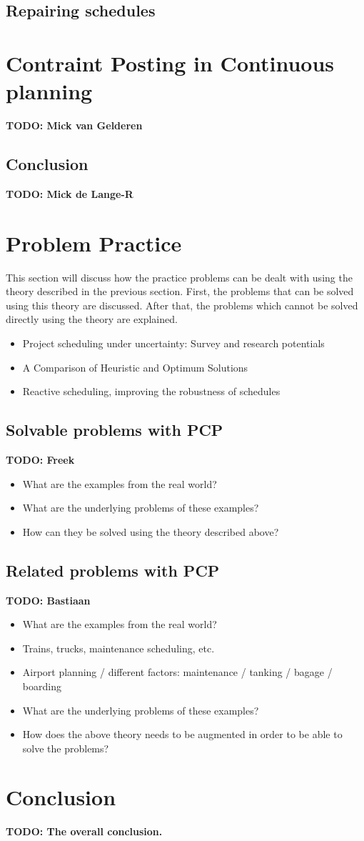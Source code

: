 \documentclass{article}
\newcommand{\TODO}[1]{{\color{red}\textbf{TODO: #1}}}
\begin{document}
\subsection{Repairing schedules}
\cite{chien00}

\section{Contraint Posting in Continuous planning}
\TODO{Mick van Gelderen}

\subsection{Conclusion}
\TODO{Mick de Lange-R}

\section{Problem Practice}
This section will discuss how the practice problems can be dealt with using the theory described in the previous section. First, the problems that can be solved using this theory are discussed. After that, the problems which cannot be solved directly using the theory are explained.\\

\begin{itemize}
\item Project scheduling under uncertainty: Survey
and research potentials
\item A Comparison of Heuristic and Optimum Solutions
\item Reactive scheduling, improving the robustness of schedules
\end{itemize}

\subsection{Solvable problems with PCP}
\TODO{Freek}
\begin{itemize}
\item What are the examples from the real world? 
\item What are the underlying problems of these examples?
\item How can they be solved using the theory described above?
\end{itemize}

\subsection{Related problems with PCP}
\TODO{Bastiaan}
\begin{itemize}
\item What are the examples from the real world?
\item Trains, trucks, maintenance scheduling, etc.
\item Airport planning / different factors: maintenance / tanking / bagage / boarding
\item What are the underlying problems of these examples?
\item How does the above theory needs to be augmented in order to be able to solve the problems?
\end{itemize}

\section{Conclusion}
\TODO{The overall conclusion.}



\end{document}
